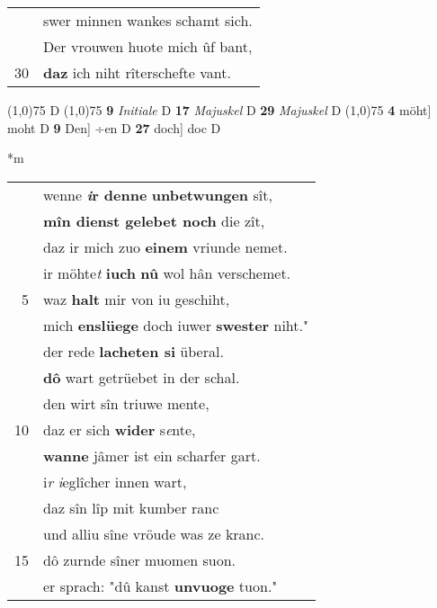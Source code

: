\documentclass[8pt,a4paper,notitlepage]{article}
\begin{document}
\begin{table}[ht]
\begin{minipage}[t]{0.5\linewidth}
\begin{tabular}{rl}
 & swer minnen wankes schamt sich.\\ 
 & Der vrouwen huote mich ûf bant,\\ 
30 & \textbf{daz} ich niht rîterschefte vant.\\ 
\end{tabular}
\scriptsize
\line(1,0){75} \newline
D \newline
\line(1,0){75} \newline
\textbf{9} \textit{Initiale} D  \textbf{17} \textit{Majuskel} D  \textbf{29} \textit{Majuskel} D  \newline
\line(1,0){75} \newline
\textbf{4} möht] moht D \textbf{9} Den] ÷en D \textbf{27} doch] doc D \newline
\end{minipage}
\hspace{0.5cm}
\begin{minipage}[t]{0.5\linewidth}
\small
\begin{center}*m
\end{center}
\begin{tabular}{rl}
 & wenne \textbf{\textit{i}r denne} \textbf{unbetwungen} sît,\\ 
 & \textbf{mîn dienst gelebet noch} die zît,\\ 
 & daz ir mich zuo \textbf{einem} vriunde nemet.\\ 
 & ir möhte\textit{t} \textbf{iuch} \textbf{nû} wol hân verschemet.\\ 
5 & waz \textbf{halt} mir von iu geschiht,\\ 
 & mich \textbf{enslüege} doch iuwer \textbf{swester} niht."\\ 
 & der rede \textbf{lacheten si} überal.\\ 
 & \textbf{dô} wart getrüebet in der schal.\\ 
 & den wirt sîn triuwe mente,\\ 
10 & daz er sich \textbf{wider} s\textit{e}nte,\\ 
 & \textbf{wanne} jâmer ist ein scharfer gart.\\ 
 & i\textit{r} \textit{i}eglîcher innen wart,\\ 
 & daz sîn lîp mit kumber ranc\\ 
 & und alliu sîne vröude was ze kranc.\\ 
15 & dô zurnde sîner muomen suon.\\ 
 & er sprach: "dû kanst \textbf{unvuoge} tuon."\\ 

\end{tabular}
\end{minipage}
\end{table}
\end{document}
